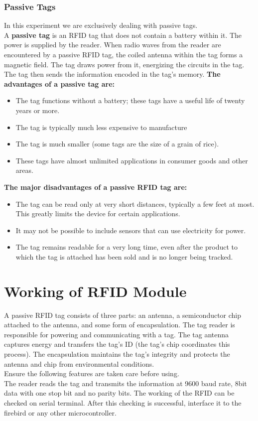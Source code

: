 \documentclass[a4paper,29.6pt]{article}
\begin{document}
\subsubsection{Passive Tags}
\begin{small}
In this experiment we are exclusively dealing with passive tags.\\
A \textbf{ passive tag }is an RFID tag that does not contain a battery within it. The power is supplied by the reader. When radio waves from the reader are encountered by a passive RFID tag, the coiled antenna within the tag forms a magnetic field. The tag draws power from it, energizing the circuits in the tag. The tag then sends the information encoded in the tag's memory.
\newpage
\textbf{The advantages of a passive tag are:}\\ 
\begin{itemize}
\item	The tag functions without a battery; these tags have a useful life of twenty years or more. 
\item	The tag is typically much less expensive to manufacture 
\item	The tag is much smaller (some tags are the size of a grain of rice).
\item These tags have almost unlimited applications in consumer goods and other areas.
\end{itemize}
 
\textbf{The major disadvantages of a passive RFID tag are: }
\begin{itemize}
\item	The tag can be read only at very short distances, typically a few feet at most. This greatly limits the device for certain applications. 
\item	It may not be possible to include sensors that can use electricity for power. 
\item	The tag remains readable for a very long time, even after the product to which the tag is attached has been sold and is no longer being tracked.
\end{itemize}
 

\end{small}

\section{Working of RFID Module}
A  passive  RFID tag  consists  of  three  parts:  an antenna,  a  semiconductor  chip  attached  to  the  antenna,  and  some  form  of encapsulation. The tag reader is responsible for powering and communicating with a tag. The tag antenna captures energy and transfers the tag’s ID (the tag’s chip coordinates this process).  The encapsulation maintains the tag’s integrity  and protects  the  antenna and  chip  from  environmental  conditions.\\ Ensure the following features are taken care before using.\\
The reader reads the tag and transmits the information at 9600 baud rate, 8bit data with one stop bit and no parity bits. The working of the RFID can be checked on serial terminal. After this checking is successful, interface it to the firebird or any other microcontroller.
\end{document}
